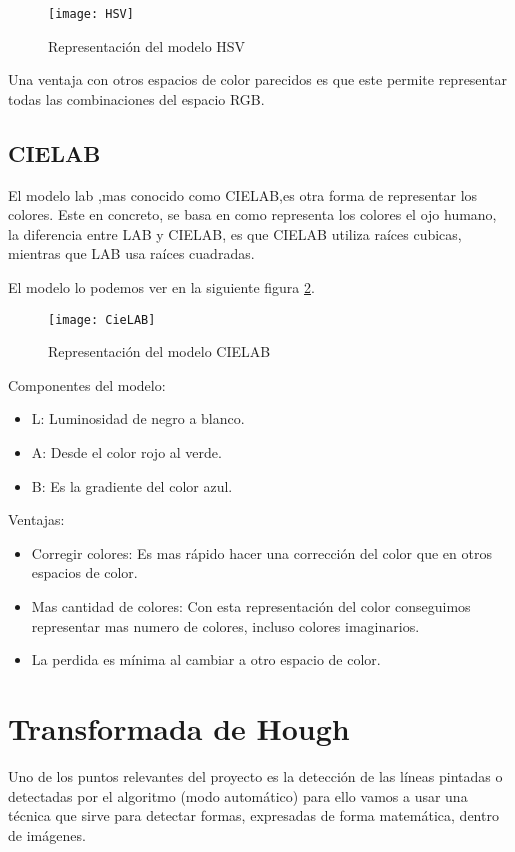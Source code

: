 \begin{figure}[h]
\centering
\texttt{[image: HSV]}
\caption{Representación del modelo HSV\cite{Manual:HAE}}
\label{fig:3.4}
\end{figure}

Una ventaja con otros espacios de color parecidos es que este permite representar todas las combinaciones del espacio RGB.

\subsection{CIELAB}
El modelo lab \cite{wiki:lab},mas conocido como CIELAB,es otra forma de representar los colores. Este en concreto, se basa en como representa los colores el ojo humano, la diferencia entre LAB y CIELAB, es que CIELAB utiliza raíces cubicas, mientras que LAB usa raíces cuadradas.

El modelo lo podemos ver en la siguiente figura  \ref{fig:3.8}.

\begin{figure}[h]
\centering
\texttt{[image: CieLAB]}
\caption{Representación del modelo CIELAB\cite{cie:LAB}}
\label{fig:3.8}
\end{figure}


Componentes del modelo:
\begin{itemize}
	\item L: Luminosidad de negro a blanco.
	\item A: Desde el color rojo al verde.
	\item B: Es la gradiente del color azul.
\end{itemize}

Ventajas:
\begin{itemize}
\item Corregir colores: Es mas rápido hacer una corrección del color que en otros espacios de color.
\item Mas cantidad de colores: Con esta representación del color conseguimos representar mas numero de colores, incluso colores imaginarios.
\item La perdida es mínima al cambiar a otro espacio de color.
\end{itemize}

\section{Transformada de Hough }

Uno de los puntos relevantes del proyecto es la detección de las líneas pintadas o detectadas por el algoritmo (modo automático) para ello vamos a usar una técnica que sirve para detectar formas, expresadas de forma matemática, dentro de imágenes.

